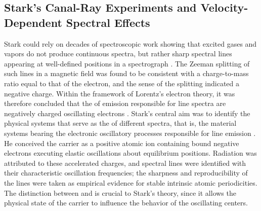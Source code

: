 \documentclass[pdflatex]{sn-jnl} %
\providecommand{\DIFaddbegin}{} %
\providecommand{\DIFaddend}{} %
\providecommand{\DIFdelbegin}{} %
\providecommand{\DIFdelend}{} %
\begin{document}
\DIFdelbegin %
\DIFdelend \DIFaddbegin \subsection{Stark’s Canal-Ray Experiments and Velocity-Dependent Spectral Effects\label{sub:stark}}
\DIFaddend %
Stark could rely on decades of spectroscopic work showing that excited gases and vapors do not produce continuous spectra, but rather sharp spectral lines appearing at well-defined positions in a spectrograph \citep{Hentschel2002}. The Zeeman splitting of such lines in a magnetic field was found to be consistent with a charge-to-mass ratio equal to that of the electron, and the sense of the splitting indicated a negative charge. Within the framework of Lorentz’s electron theory, it was therefore concluded that the   of emission responsible for line spectra are negatively charged oscillating electrons \citep[401]{Stark1906}. Stark’s central aim was to identify the physical systems that serve as the   of different spectra, that is, the material systems bearing the electronic oscillatory processes responsible for line emission \citep[402]{Stark1906}. He conceived the carrier as a positive atomic ion containing bound negative electrons executing elastic oscillations about equilibrium positions. Radiation was attributed to these accelerated charges, and spectral lines were identified with their characteristic oscillation frequencies; the sharpness and reproducibility of the lines were taken as empirical evidence for stable intrinsic atomic periodicities. The distinction between  and  is crucial to Stark’s theory, since it allows the physical state of the carrier to influence the behavior of the oscillating centers.
\end{document}
